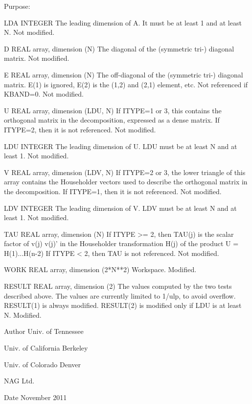 \begin{DoxyParagraph}{Purpose\+: }
\begin{DoxyVerb}
  LDA     INTEGER
          The leading dimension of A.  It must be at least 1
          and at least N.
          Not modified.

  D       REAL array, dimension (N)
          The diagonal of the (symmetric tri-) diagonal matrix.
          Not modified.

  E       REAL array, dimension (N)
          The off-diagonal of the (symmetric tri-) diagonal matrix.
          E(1) is ignored, E(2) is the (1,2) and (2,1) element, etc.
          Not referenced if KBAND=0.
          Not modified.

  U       REAL array, dimension (LDU, N)
          If ITYPE=1 or 3, this contains the orthogonal matrix in
          the decomposition, expressed as a dense matrix.  If ITYPE=2,
          then it is not referenced.
          Not modified.

  LDU     INTEGER
          The leading dimension of U.  LDU must be at least N and
          at least 1.
          Not modified.

  V       REAL array, dimension (LDV, N)
          If ITYPE=2 or 3, the lower triangle of this array contains
          the Householder vectors used to describe the orthogonal
          matrix in the decomposition.  If ITYPE=1, then it is not
          referenced.
          Not modified.

  LDV     INTEGER
          The leading dimension of V.  LDV must be at least N and
          at least 1.
          Not modified.

  TAU     REAL array, dimension (N)
          If ITYPE >= 2, then TAU(j) is the scalar factor of
          v(j) v(j)' in the Householder transformation H(j) of
          the product  U = H(1)...H(n-2)
          If ITYPE < 2, then TAU is not referenced.
          Not modified.

  WORK    REAL array, dimension (2*N**2)
          Workspace.
          Modified.

  RESULT  REAL array, dimension (2)
          The values computed by the two tests described above.  The
          values are currently limited to 1/ulp, to avoid overflow.
          RESULT(1) is always modified.  RESULT(2) is modified only
          if LDU is at least N.
          Modified.\end{DoxyVerb}
 
\end{DoxyParagraph}
\begin{DoxyAuthor}{Author}
Univ. of Tennessee 

Univ. of California Berkeley 

Univ. of Colorado Denver 

N\+A\+G Ltd. 
\end{DoxyAuthor}
\begin{DoxyDate}{Date}
November 2011 
\end{DoxyDate}
